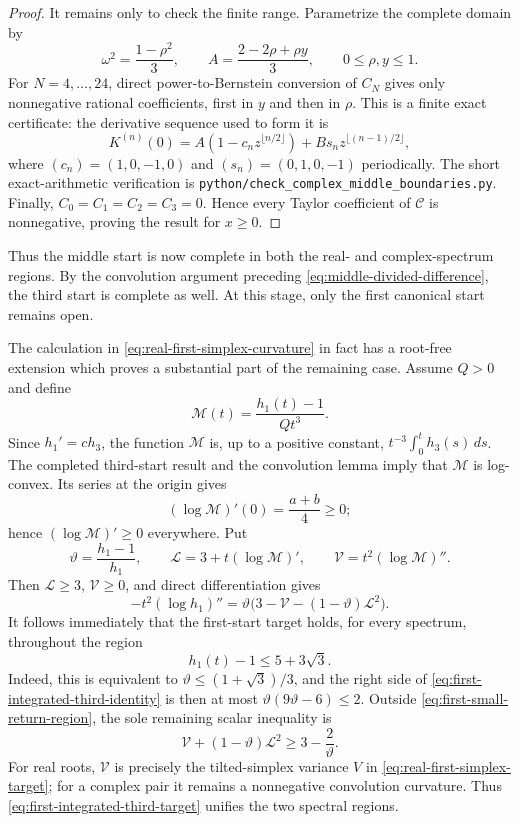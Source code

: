\documentclass[11pt]{article}
\theoremstyle{remark}
\begin{document}
\begin{proof}
It remains only to check the finite range.  Parametrize the complete domain
by
\[
 \omega^2=\frac{1-\rho^2}{3},\qquad
 A=\frac{2-2\rho+\rho y}{3},
 \qquad 0\leq\rho,y\leq1.
\]
For $N=4,\ldots,24$, direct power-to-Bernstein conversion of $C_N$ gives
only nonnegative rational coefficients, first in $y$ and then in $\rho$.
This is a finite exact certificate: the derivative sequence used to form it
is
\[
 K^{(n)}(0)=A(1-c_nz^{\lfloor n/2\rfloor})
 +B s_nz^{\lfloor(n-1)/2\rfloor},
\]
where $(c_n)=(1,0,-1,0)$ and $(s_n)=(0,1,0,-1)$ periodically.  The short
exact-arithmetic verification is
\texttt{python/check\_complex\_middle\_boundaries.py}.  Finally,
$C_0=C_1=C_2=C_3=0$.  Hence every Taylor coefficient of $\mathcal C$ is
nonnegative, proving the result for $x\geq0$.
\end{proof}

Thus the middle start is now complete in both the real- and complex-spectrum
regions.  By the convolution argument preceding
\eqref{eq:middle-divided-difference}, the third start is complete as well.
At this stage, only the first canonical start remains open.

The calculation in \eqref{eq:real-first-simplex-curvature} in fact has a
root-free extension which proves a substantial part of the remaining case.
Assume $Q>0$ and define
\[
 \mathcal M(t)=\frac{h_1(t)-1}{Qt^3}.
\]
Since $h_1'=c h_3$, the function $\mathcal M$ is, up to a positive constant,
$t^{-3}\int_0^t h_3(s)\,ds$.  The completed third-start result and the
convolution lemma imply that $\mathcal M$ is log-convex.  Its series at the
origin gives
\[
 (\log\mathcal M)'(0)=\frac{a+b}{4}\geq0;
\]
hence $(\log\mathcal M)'\geq0$ everywhere.  Put
\[
 \vartheta=\frac{h_1-1}{h_1},\qquad
 \mathcal L=3+t(\log\mathcal M)',\qquad
 \mathcal V=t^2(\log\mathcal M)''.
\]
Then $\mathcal L\geq3$, $\mathcal V\geq0$, and direct differentiation gives
\begin{equation}\label{eq:first-integrated-third-identity}
 -t^2(\log h_1)''
 =\vartheta\bigl(3-\mathcal V
 -(1-\vartheta)\mathcal L^2\bigr).
\end{equation}
It follows immediately that the first-start target holds, for every spectrum,
throughout the region
\begin{equation}\label{eq:first-small-return-region}
 h_1(t)-1\leq5+3\sqrt3.
\end{equation}
Indeed, this is equivalent to
$\vartheta\leq(1+\sqrt3)/3$, and the right side of
\eqref{eq:first-integrated-third-identity} is then at most
$\vartheta(9\vartheta-6)\leq2$.  Outside
\eqref{eq:first-small-return-region}, the sole remaining scalar inequality is
\begin{equation}\label{eq:first-integrated-third-target}
 \mathcal V+(1-\vartheta)\mathcal L^2
 \geq3-\frac2\vartheta.
\end{equation}
For real roots, $\mathcal V$ is precisely the tilted-simplex variance $V$ in
\eqref{eq:real-first-simplex-target}; for a complex pair it remains a
nonnegative convolution curvature.  Thus
\eqref{eq:first-integrated-third-target} unifies the two spectral regions.
\end{document}
